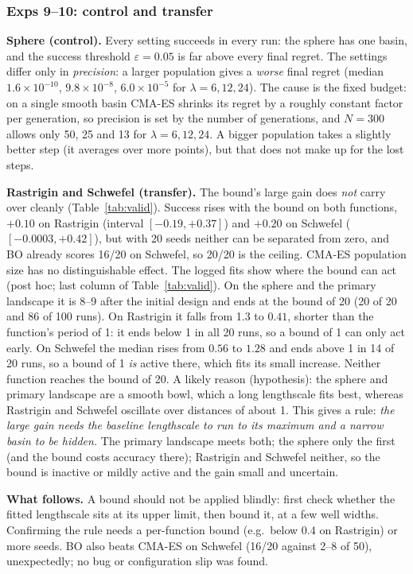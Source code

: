 \documentclass[10pt,a4paper]{article}
\begin{document}
\subsubsection{Exps 9--10: control and transfer}
\textbf{Sphere (control).} Every setting succeeds in every run: the sphere has one basin, and the success threshold $\varepsilon=0.05$ is far above every final regret. The settings differ only in \emph{precision}: a larger population gives a \emph{worse} final regret (median $1.6\times10^{-10}$, $9.8\times10^{-8}$, $6.0\times10^{-5}$ for $\lambda=6,12,24$). The cause is the fixed budget: on a single smooth basin CMA-ES shrinks its regret by a roughly constant factor per generation, so precision is set by the number of generations, and $N=300$ allows only 50, 25 and 13 for $\lambda=6,12,24$. A bigger population takes a slightly better step (it averages over more points), but that does not make up for the lost steps.

\textbf{Rastrigin and Schwefel (transfer).} The bound's large gain does \emph{not} carry over cleanly (Table~\ref{tab:valid}). Success rises with the bound on both functions, $+0.10$ on Rastrigin (interval $[-0.19,+0.37]$) and $+0.20$ on Schwefel ($[-0.0003,+0.42]$), but with 20 seeds neither can be separated from zero, and BO already scores 16/20 on Schwefel, so 20/20 is the ceiling. CMA-ES population size has no distinguishable effect. The logged fits show where the bound can act (post hoc; last column of Table~\ref{tab:valid}). On the sphere and the primary landscape it is 8--9 after the initial design and ends at the bound of 20 (20 of 20 and 86 of 100 runs). On Rastrigin it falls from 1.3 to $0.41$, shorter than the function's period of 1: it ends below 1 in all 20 runs, so a bound of 1 can only act early. On Schwefel the median rises from $0.56$ to $1.28$ and ends above 1 in 14 of 20 runs, so a bound of 1 \emph{is} active there, which fits its small increase. Neither function reaches the bound of 20. A likely reason (hypothesis): the sphere and primary landscape are a smooth bowl, which a long lengthscale fits best, whereas Rastrigin and Schwefel oscillate over distances of about 1. This gives a rule: \emph{the large gain needs the baseline lengthscale to run to its maximum and a narrow basin to be hidden.} The primary landscape meets both; the sphere only the first (and the bound costs accuracy there); Rastrigin and Schwefel neither, so the bound is inactive or mildly active and the gain small and uncertain.

\textbf{What follows.} A bound should not be applied blindly: first check whether the fitted lengthscale sits at its upper limit, then bound it, at a few well widths. Confirming the rule needs a per-function bound (e.g.\ below 0.4 on Rastrigin) or more seeds. BO also beats CMA-ES on Schwefel (16/20 against 2--8 of 50), unexpectedly; no bug or configuration slip was found.
\end{document}
